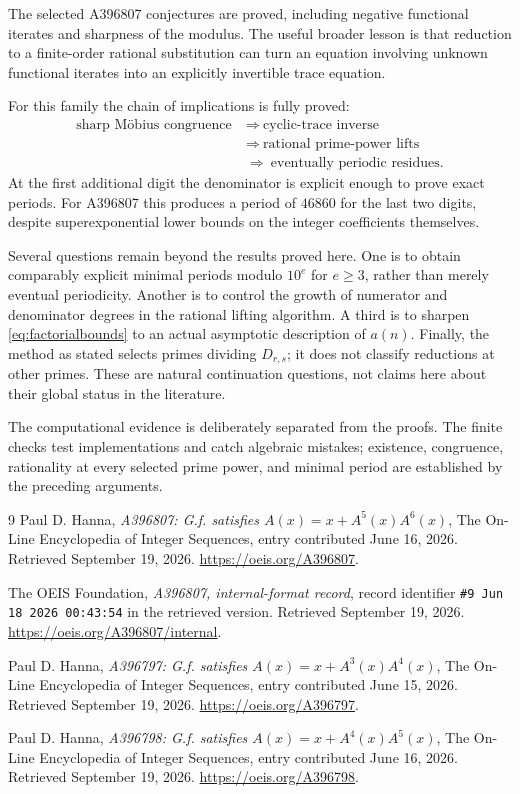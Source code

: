 \documentclass[11pt,letterpaper]{article}
\theoremstyle{definition}
\theoremstyle{remark}
\begin{document}
The selected A396807 conjectures are proved, including negative
functional iterates and sharpness of the modulus.  The useful broader
lesson is that reduction to a finite-order rational substitution can
turn an equation involving unknown functional iterates into an
explicitly invertible trace equation.

For this family the chain of implications is fully proved:
\[
 \begin{aligned}
 \text{sharp M\"obius congruence}
 &\ \Longrightarrow\ \text{cyclic-trace inverse}\\
 &\ \Longrightarrow\ \text{rational prime-power lifts}\\
 &\ \Longrightarrow\ \text{eventually periodic residues}.
 \end{aligned}
\]
At the first additional digit the denominator is explicit enough to
prove exact periods.  For A396807 this produces a period of $46860$
for the last two digits, despite superexponential lower bounds on the
integer coefficients themselves.

Several questions remain beyond the results proved here.  One is to
obtain comparably explicit minimal periods modulo $10^e$ for $e\geq3$,
rather than merely eventual periodicity.  Another is to control the
growth of numerator and denominator degrees in the rational lifting
algorithm.  A third is to sharpen \eqref{eq:factorialbounds} to an actual
asymptotic description of $a(n)$.  Finally, the method as stated selects
primes dividing $D_{r,s}$; it does not classify reductions at other
primes.  These are natural continuation questions, not claims here
about their global status in the literature.

The computational evidence is deliberately separated from the proofs.
The finite checks test implementations and catch algebraic mistakes;
existence, congruence, rationality at every selected prime power, and
minimal period are established by the preceding arguments.

\begin{thebibliography}{9}
Paul D. Hanna, \emph{A396807: G.f. satisfies
$A(x)=x+A^5(x)A^6(x)$}, The On-Line Encyclopedia of Integer Sequences,
entry contributed June 16, 2026. Retrieved September 19, 2026.
\url{https://oeis.org/A396807}.

The OEIS Foundation, \emph{A396807, internal-format record},
record identifier \texttt{\#9 Jun 18 2026 00:43:54} in the retrieved
version. Retrieved September 19, 2026.
\url{https://oeis.org/A396807/internal}.

Paul D. Hanna, \emph{A396797: G.f. satisfies
$A(x)=x+A^3(x)A^4(x)$}, The On-Line Encyclopedia of Integer Sequences,
entry contributed June 15, 2026. Retrieved September 19, 2026.
\url{https://oeis.org/A396797}.

Paul D. Hanna, \emph{A396798: G.f. satisfies
$A(x)=x+A^4(x)A^5(x)$}, The On-Line Encyclopedia of Integer Sequences,
entry contributed June 16, 2026. Retrieved September 19, 2026.
\url{https://oeis.org/A396798}.
\end{thebibliography}
\end{document}
